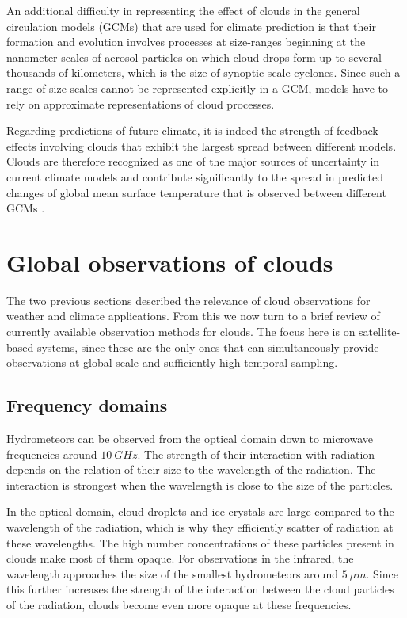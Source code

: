 An additional difficulty in representing the effect of clouds in the general
circulation models (GCMs) that are used for climate prediction is that their
formation and evolution involves processes at size-ranges beginning at the
nanometer scales of aerosol particles on which cloud drops form up to several
thousands of kilometers, which is the size of synoptic-scale cyclones. Since
such a range of size-scales cannot be represented explicitly in a GCM, models
have to rely on approximate representations of cloud processes.

Regarding predictions of future climate, it is indeed the strength of feedback
effects involving clouds that exhibit the largest spread between different
models. Clouds are therefore recognized as one of the major sources of
uncertainty in current climate models and contribute significantly to the spread
in predicted changes of global mean surface temperature that is observed between
different GCMs \parencite{boucher13}.

\section{Global observations of clouds}
\label{sec:observations}

The two previous sections described the relevance of cloud observations for
weather and climate applications. From this we now turn to a brief review of
currently available observation methods for clouds. The focus here is on
satellite-based systems, since these are the only ones that can simultaneously
provide observations at global scale and sufficiently high temporal sampling.

\subsection{Frequency domains}

Hydrometeors can be observed from the optical domain down to microwave
frequencies around $10\ \unit{GHz}$. The strength of their interaction with
radiation depends on the relation of their size to the wavelength of the
radiation. The interaction is strongest when the wavelength is close to the
size of the particles.

In the optical domain, cloud droplets and ice crystals are large compared to the
wavelength of the radiation, which is why they efficiently scatter of radiation
at these wavelengths. The high number concentrations of these particles present
in clouds make most of them opaque. For observations in the infrared, the
wavelength approaches the size of the smallest hydrometeors around $5\ \unit{\mu
  m}$. Since this further increases the strength of the interaction between the
cloud particles of the radiation, clouds become even more opaque at these
frequencies.

